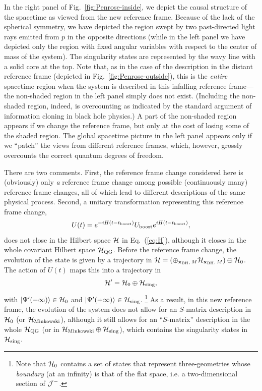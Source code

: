 \documentclass[12pt]{article}
\begin{document}
In the right panel of Fig.~\ref{fig:Penrose-inside}, we depict the 
causal structure of the spacetime as viewed from the new reference frame. 
Because of the lack of the spherical symmetry, we have depicted the region 
swept by two past-directed light rays emitted from $p$ in the opposite 
directions (while in the left panel we have depicted only the region with 
fixed angular variables with respect to the center of mass of the system). 
The singularity states are represented by the wavy line with a solid core 
at the top.  Note that, as in the case of the description in the distant 
reference frame (depicted in Fig.~\ref{fig:Penrose-outside}), this is 
the {\it entire} spacetime region when the system is described in this 
infalling reference frame---the non-shaded region in the left panel 
simply does not exist.  (Including the non-shaded region, indeed, is 
overcounting as indicated by the standard argument of information cloning 
in black hole physics.)  A part of the non-shaded region appears if we 
change the reference frame, but only at the cost of losing some of the 
shaded region.  The global spacetime picture in the left panel appears 
only if we ``patch'' the views from different reference frames, which, 
however, grossly overcounts the correct quantum degrees of freedom.

There are two comments.  First, the reference frame change considered 
here is (obviously) only {\it a} reference frame change among possible 
(continuously many) reference frame changes, all of which lead to 
different descriptions of the same physical process.  Second, a unitary 
transformation representing this reference frame change,
%
\begin{equation}
  U(t) = e^{-iH(t-t_{\rm boost})} U_{\rm boost} e^{iH(t-t_{\rm boost})},
\label{eq:U-ref}
\end{equation}
%
does not close in the Hilbert space ${\cal H}$ in Eq.~(\ref{eq:H}), 
although it closes in the whole covariant Hilbert space ${\cal H}_{\rm QG}$. 
Before the reference frame change, the evolution of the state is 
given by a trajectory in ${\cal H} = ( \oplus_{{\bf x}_{\rm BH},\, M} 
{\cal H}_{{\bf x}_{\rm BH},\, M} ) \oplus {\cal H}_0$.  The action 
of $U(t)$ maps this into a trajectory in
%
\begin{equation}
  {\cal H}' = {\cal H}_0 \oplus {\cal H}_{\rm sing},
\label{eq:H'}
\end{equation}
%
with $\ket{\Psi'(-\infty)} \in {\cal H}_0$ and $\ket{\Psi'(+\infty)} 
\in {\cal H}_{\rm sing}$.%
\footnote{Note that ${\cal H}_0$ contains a set of states that represent 
 three-geometries whose {\it boundary} (at an infinity) is that of the 
 flat space, i.e. a two-dimensional section of ${\cal J}^-$.}
As a result, in this new reference frame, the evolution of the 
system does not allow for an $S$-matrix description in ${\cal H}_0$ 
(or ${\cal H}_{\rm Minkowski}$), although it still allows for an 
``$S$-matrix'' description in the whole ${\cal H}_{\rm QG}$ (or in 
${\cal H}_{\rm Minkowski} \oplus {\cal H}_{\rm sing}$), which 
contains the singularity states in ${\cal H}_{\rm sing}$.
\end{document}
